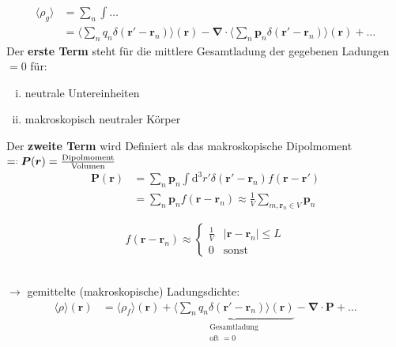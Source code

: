 \documentclass[titlepage,11pt,a4paper,ngerman]{report}
\newcommand*{\eqdef}{=\mathrel{\vcenter{\baselineskip0.5ex \lineskiplimit0pt \hbox{\scriptsize.}\hbox{\scriptsize.}}}}
\newcommand{\tx}[1]{\textrm{#1}}
\newcommand{\ub}[1]{\underbrace{#1}}
\newcommand{\dd}{\tx{d}}
\renewcommand{\vec}[1]{\boldsymbol{#1}}
\newcommand{\vabla}{\boldsymbol{\nabla}}
\begin{document}
\noindent
\begin{align*}
\langle \rho_g \rangle &= \sum_n \int \dots \\
&= \langle \sum_n q_n \delta(\vec{r}' - \vec{r}_n) \rangle (\vec{r}) - \vabla \cdot \langle \sum_n \vec{p}_n \delta(\vec{r}' - \vec{r}_n) \rangle(\vec{r}) + \dots
\end{align*}
Der \textbf{erste Term} steht für die mittlere Gesamtladung der gegebenen Ladungen $ = 0 $ für:
\begin{enumerate}[i)]
	\item neutrale Untereinheiten
	\item makroskopisch neutraler Körper
\end{enumerate}
Der \textbf{zweite Term} wird Definiert als das makroskopische Dipolmoment $ \eqdef \vec{P} (\vec{r}) = \frac{\tx{Dipolmoment}}{\tx{Volumen}} $
\begin{align}
\vec{P}(\vec{r}) &= \sum_n \vec{p}_n \int \dd^3r' \delta(\vec{r}' - \vec{r}_n) f(\vec{r} - \vec{r}')\\
&= \sum_n \vec{p}_n f(\vec{r} - \vec{r}_n) \approx \frac{1}{V} \sum_{m,\vec{r}_n \in V} \vec{p}_n
\end{align}
\begin{minipage}{.5\linewidth}
	\begin{equation*}
	f(\vec{r} - \vec{r}_n) \approx \left\{ \begin{array}{cc}
	\frac{1}{V} & |\vec{r} - \vec{r}_n| \le L \\[5pt]
	0 & \tx{sonst}
	\end{array}\right.
	\end{equation*}
\end{minipage}%
\begin{minipage}{.5\linewidth}
	\centering
\end{minipage}%
\\
$ \rightarrow $ gemittelte (makroskopische) Ladungsdichte:
\begin{align*}
\langle \rho \rangle (\vec{r}) &= \langle \rho_f \rangle(\vec{r}) + \ub{\langle \sum_n q_n \delta(\vec{r}' - \vec{r}_n) \rangle(\vec{r})}_{\substack{\tx{Gesamtladung} \\ \tx{oft } = 0}} - \vabla \cdot \vec{P} + \dots
\end{align*}
\end{document}

